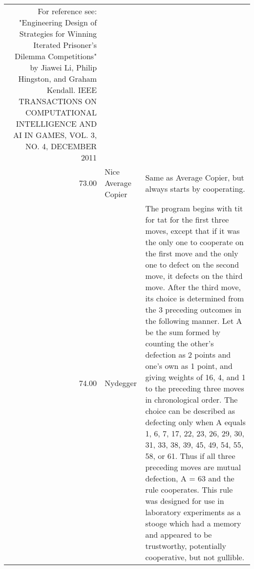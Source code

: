 \begin{table}[!hbtp]
\begin{adjustbox}{width=2\textwidth, angle=90}
\begin{tabular}{rll}
	For reference see: "Engineering Design of Strategies for Winning
	Iterated Prisoner's Dilemma Competitions" by Jiawei Li, Philip Hingston,
	and Graham Kendall.  IEEE TRANSACTIONS ON COMPUTATIONAL INTELLIGENCE AND AI
	IN GAMES, VOL. 3, NO. 4, DECEMBER 2011                                                                                                                                                                                                                                                                                                                                                                                                                                                                                                                                                                                                                                                                    \\
	73.00  & Nice Average Copier         & Same as Average Copier, but always starts by cooperating.                                                                         \\
	74.00  & Nydegger                    & The program begins with tit for tat for the first three moves, except that
                                        	if it was the only one to cooperate on the first move and the only one to
                                        	defect on the second move, it defects on the third move. After the third move,
                                        	its choice is determined from the 3 preceding outcomes in the following manner.
                                        	Let A be the sum formed by counting the other's defection as 2 points and one's
                                        	own as 1 point, and giving weights of 16, 4, and 1 to the preceding three
                                        	moves in chronological order. The choice can be described as defecting only
                                        	when A equals 1, 6, 7, 17, 22, 23, 26, 29, 30, 31, 33, 38, 39, 45, 49, 54,
                                        	55, 58, or 61. Thus if all three preceding moves are mutual defection,
                                        	A = 63 and the rule cooperates. This rule was designed for use in laboratory
                                        	experiments as a stooge which had a memory and appeared to be trustworthy,
                                        	potentially cooperative, but not gullible.


\end{tabular}
\end{adjustbox}
\end{table}
